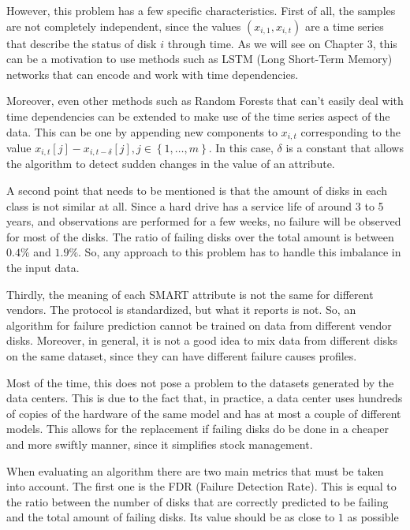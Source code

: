 However, this problem has  a few specific characteristics.
First of all, the samples are not completely independent, since the values $\left(x_{i,1},x_{i,t}\right)$ are a time series that describe the status of disk $i$ through time.
As we will see on Chapter 3, this can be a motivation to use methods such as LSTM (Long Short-Term Memory) networks that can encode and work with time dependencies.

Moreover, even other methods such as Random Forests that can't easily deal with time dependencies can be extended to make use of the time series aspect of the data.
This can be one by appending new components to $x_{i,t}$ corresponding to the value $x_{i,t}[j] - x_{i,t-\delta}[j], j\in\left\{1,\dots,m\right\}$.
In this case, $\delta$ is a constant that allows the algorithm to detect sudden changes in the value of an attribute\cite{Shen18}.

A second point that needs to be mentioned is that the amount of disks in each class is not similar at all.
Since a hard drive has a service life of around 3 to 5 years\cite{Vishwanath10}, and observations are performed for a few weeks, no failure will be observed for most of the disks.
The ratio of failing disks over the total amount is between $0.4\%$ and $1.9\%$\cite{Xu16}.
So, any approach to this problem has to handle this imbalance in the input data.

Thirdly, the meaning of each SMART attribute is not the same for different vendors\cite{SamsungSSD}.
The protocol is standardized, but what it reports is not.
So, an algorithm for failure prediction cannot be trained on data from different vendor disks.
Moreover, in general, it is not a good idea to mix data from different disks on the same dataset, since they can have different failure causes profiles.

Most of the time, this does not pose a problem to the datasets generated by the data centers.
This is due to the fact that, in practice, a data center uses hundreds of copies of the hardware of the same model and has at most a couple of different models.
This allows for the replacement if failing disks do be done in a cheaper and more swiftly manner, since it simplifies stock management.

When evaluating an algorithm there are two main metrics that must be taken into account.
The first one is the FDR (Failure Detection Rate).
This is equal to the ratio between the number of disks that are correctly predicted to be failing and the total amount of failing disks.
Its value should be as close to $1$ as possible

